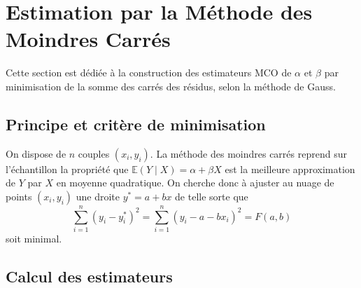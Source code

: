 \documentclass[12pt,a4paper]{article}
\theoremstyle{definition}
\theoremstyle{remark}
\newcommand{\Esp}{\mathbb{E}}
\begin{document}

\section{Estimation par la Méthode des Moindres Carrés}
\label{sec:mco}

Cette section est dédiée à la construction des estimateurs MCO de $\alpha$ et $\beta$
par minimisation de la somme des carrés des résidus, selon la méthode de Gauss.

\subsection{Principe et critère de minimisation}

On dispose de $n$ couples $(x_i, y_i)$.
La méthode des moindres carrés reprend sur l'échantillon la propriété que
$\Esp(Y \mid X) = \alpha + \beta X$ est la meilleure approximation de $Y$ par $X$
en moyenne quadratique.
On cherche donc à ajuster au nuage de points $(x_i, y_i)$ une droite $y^* = a + bx$
de telle sorte que
\[
  \sum_{i=1}^n (y_i - y_i^*)^2 = \sum_{i=1}^n (y_i - a - bx_i)^2 = F(a,b)
\]
soit minimal.

\subsection{Calcul des estimateurs}
\end{document}
